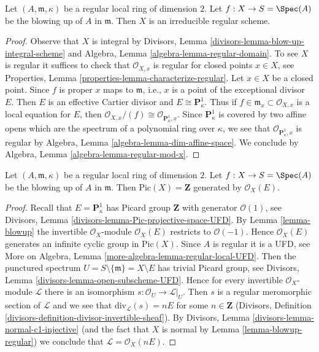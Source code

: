 \begin{lemma}
\label{lemma-blowup-regular}
Let $(A, \mathfrak m, \kappa)$ be a regular local ring of dimension $2$.
Let $f : X \to S = \Spec(A)$ be the blowing up of $A$ in $\mathfrak m$.
Then $X$ is an irreducible regular scheme.
\end{lemma}

\begin{proof}
Observe that $X$ is integral by
Divisors, Lemma \ref{divisors-lemma-blow-up-integral-scheme}
and
Algebra, Lemma \ref{algebra-lemma-regular-domain}.
To see $X$ is regular it suffices to check that $\mathcal{O}_{X, x}$
is regular for closed points $x \in X$, see
Properties, Lemma \ref{properties-lemma-characterize-regular}.
Let $x \in X$ be a closed point. Since $f$ is proper $x$ maps to
$\mathfrak m$, i.e., $x$ is a point of the exceptional divisor $E$.
Then $E$ is an effective Cartier divisor and $E \cong \mathbf{P}^1_\kappa$.
Thus if $f \in \mathfrak m_x \subset \mathcal{O}_{X, x}$ is a local
equation for $E$, then
$\mathcal{O}_{X, x}/(f) \cong \mathcal{O}_{\mathbf{P}^1_\kappa, x}$.
Since $\mathbf{P}^1_\kappa$ is covered by two affine opens which are the
spectrum of a polynomial ring over $\kappa$, we see that
$\mathcal{O}_{\mathbf{P}^1_\kappa, x}$ is regular by
Algebra, Lemma \ref{algebra-lemma-dim-affine-space}.
We conclude by
Algebra, Lemma \ref{algebra-lemma-regular-mod-x}.
\end{proof}

\begin{lemma}
\label{lemma-blowup-pic}
Let $(A, \mathfrak m, \kappa)$ be a regular local ring of dimension $2$.
Let $f : X \to S = \Spec(A)$ be the blowing up of $A$ in $\mathfrak m$.
Then $\text{Pic}(X) = \mathbf{Z}$ generated by $\mathcal{O}_X(E)$.
\end{lemma}

\begin{proof}
Recall that $E = \mathbf{P}^1_\kappa$ has Picard group $\mathbf{Z}$
with generator $\mathcal{O}(1)$, see
Divisors, Lemma \ref{divisors-lemma-Pic-projective-space-UFD}.
By Lemma \ref{lemma-blowup} the invertible $\mathcal{O}_X$-module
$\mathcal{O}_X(E)$ restricts to $\mathcal{O}(-1)$. Hence
$\mathcal{O}_X(E)$ generates an infinite cyclic group in $\text{Pic}(X)$.
Since $A$ is regular it is a UFD, see More on Algebra, 
Lemma \ref{more-algebra-lemma-regular-local-UFD}.
Then the punctured spectrum $U = S \setminus \{\mathfrak m\} = X \setminus E$
has trivial Picard group, see
Divisors, Lemma \ref{divisors-lemma-open-subscheme-UFD}.
Hence for every invertible $\mathcal{O}_X$-module $\mathcal{L}$
there is an isomorphism $s : \mathcal{O}_U \to \mathcal{L}|_U$.
Then $s$ is a regular meromorphic section of $\mathcal{L}$
and we see that $\text{div}_\mathcal{L}(s) = nE$ for some
$n \in \mathbf{Z}$
(Divisors, Definition \ref{divisors-definition-divisor-invertible-sheaf}).
By Divisors, Lemma \ref{divisors-lemma-normal-c1-injective}
(and the fact that $X$ is normal by Lemma \ref{lemma-blowup-regular})
we conclude that $\mathcal{L} = \mathcal{O}_X(nE)$.
\end{proof}


